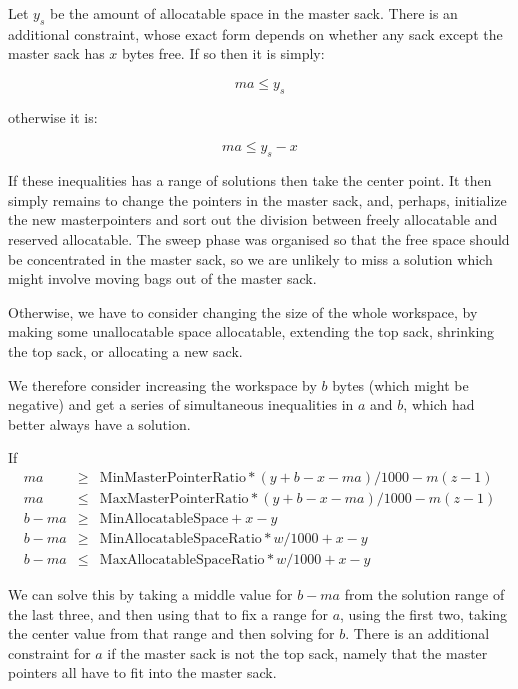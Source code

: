 \documentclass[12pt]{article}
\begin{document}
Let $y_s$ be the amount of allocatable space in 
the master sack. 
There is an additional constraint, whose exact form depends on
whether any sack except the master sack has $x$ bytes free. If so
then it is simply:

\begin{equation}
ma \le y_s
\end{equation}

otherwise it is:

\begin{equation}
ma \le y_s -x
\end{equation}

If these inequalities has a range of solutions then take the center
point. It then simply remains to change the pointers in the master
sack, and, perhaps, initialize the new masterpointers and sort out the 
division between freely allocatable and reserved allocatable. The sweep phase 
was organised so that the free space should be concentrated in the
master sack, so we are unlikely to miss a solution which might involve 
moving bags out of the master sack.

Otherwise, we have to consider changing the size of the whole
workspace, by making some unallocatable space allocatable, extending
the top sack, shrinking the top sack, or allocating a new sack.


We therefore consider increasing the workspace by $b$ bytes (which
might be negative) and get a series of simultaneous inequalities in
$a$ and $b$, which had better always have a solution.


If \begin{eqnarray}
ma &\ge& \mbox{MinMasterPointerRatio} * (y+b-x-ma) / 1000- m(z-1)\\
ma &\le& \mbox{MaxMasterPointerRatio} * (y+b-x-ma) / 1000 - m(z-1)\\
b-ma&\ge& \mbox{MinAllocatableSpace} + x-y\\
b -ma&\ge& \mbox{MinAllocatableSpaceRatio}*w/1000 + x- y\\
b -ma&\le& \mbox{MaxAllocatableSpaceRatio}*w/1000 + x -y
\end{eqnarray}


We can solve this by taking a middle value for $b-ma$ from the
solution range of the last three, and then using that to fix a range
for $a$, using the first two, taking the center value from that range
and then solving for $b$. There is an additional constraint for $a$
if the master sack is not the top sack, namely that the master
pointers all have to fit into the master sack.
\end{document}
